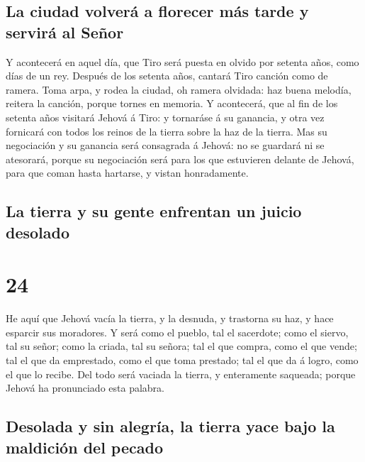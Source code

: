 \hypertarget{la-ciudad-volveruxe1-a-florecer-muxe1s-tarde-y-serviruxe1-al-seuxf1or}{%
\subsection{La ciudad volverá a florecer más tarde y servirá al
Señor}\label{la-ciudad-volveruxe1-a-florecer-muxe1s-tarde-y-serviruxe1-al-seuxf1or}}

 Y acontecerá en aquel día, que Tiro será puesta en
olvido por setenta años, como días de un rey. Después de los setenta
años, cantará Tiro canción como de ramera.  Toma arpa, y
rodea la ciudad, oh ramera olvidada: haz buena melodía, reitera la
canción, porque tornes en memoria.  Y acontecerá, que al
fin de los setenta años visitará Jehová á Tiro: y tornaráse á su
ganancia, y otra vez fornicará con todos los reinos de la tierra sobre
la haz de la tierra.  Mas su negociación y su ganancia
será consagrada á Jehová: no se guardará ni se atesorará, porque su
negociación será para los que estuvieren delante de Jehová, para que
coman hasta hartarse, y vistan honradamente.

\hypertarget{la-tierra-y-su-gente-enfrentan-un-juicio-desolado}{%
\subsection{La tierra y su gente enfrentan un juicio
desolado}\label{la-tierra-y-su-gente-enfrentan-un-juicio-desolado}}

\hypertarget{section-23}{%
\section{24}\label{section-23}}

 He aquí que Jehová vacía la tierra, y la desnuda, y
trastorna su haz, y hace esparcir sus moradores.  Y será
como el pueblo, tal el sacerdote; como el siervo, tal su señor; como la
criada, tal su señora; tal el que compra, como el que vende; tal el que
da emprestado, como el que toma prestado; tal el que da á logro, como el
que lo recibe.  Del todo será vaciada la tierra, y
enteramente saqueada; porque Jehová ha pronunciado esta palabra.

\hypertarget{desolada-y-sin-alegruxeda-la-tierra-yace-bajo-la-maldiciuxf3n-del-pecado}{%
\subsection{Desolada y sin alegría, la tierra yace bajo la maldición del
pecado}\label{desolada-y-sin-alegruxeda-la-tierra-yace-bajo-la-maldiciuxf3n-del-pecado}}


